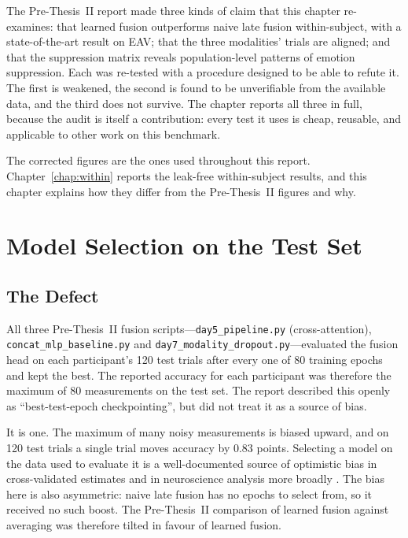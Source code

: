 The Pre-Thesis~II report made three kinds of claim that this chapter re-examines:
that learned fusion outperforms naive late fusion within-subject, with a
state-of-the-art result on EAV; that the three modalities' trials are aligned; and
that the suppression matrix reveals population-level patterns of emotion suppression.
Each was re-tested with a procedure designed to be able to refute it. The first is
weakened, the second is found to be unverifiable from the available data, and the
third does not survive. The chapter reports all three in full, because the audit is
itself a contribution: every test it uses is cheap, reusable, and applicable to other
work on this benchmark.

The corrected figures are the ones used throughout this report. Chapter~\ref{chap:within}
reports the leak-free within-subject results, and this chapter explains how they
differ from the Pre-Thesis~II figures and why.

\section{Model Selection on the Test Set}
\label{sec:audit_selection}

\subsection{The Defect}

All three Pre-Thesis~II fusion scripts---\texttt{day5\_pipeline.py} (cross-attention),
\texttt{concat\_mlp\_baseline.py} and \texttt{day7\_modality\_dropout.py}---evaluated
the fusion head on each participant's 120 test trials after every one of 80 training
epochs and kept the best. The reported accuracy for each participant was therefore the
maximum of 80 measurements on the test set. The report described this openly as
``best-test-epoch checkpointing'', but did not treat it as a source of bias.

It is one. The maximum of many noisy measurements is biased upward, and on 120 test
trials a single trial moves accuracy by 0.83 points. Selecting a model on the data used
to evaluate it is a well-documented source of optimistic bias in cross-validated
estimates \cite{Varma2006CVBias,Cawley2010Overfitting} and in neuroscience analysis
more broadly \cite{Kriegeskorte2009DoubleDipping}. The bias here is also asymmetric:
naive late fusion has no epochs to select from, so it received no such boost. The
Pre-Thesis~II comparison of learned fusion against averaging was therefore tilted in
favour of learned fusion.

